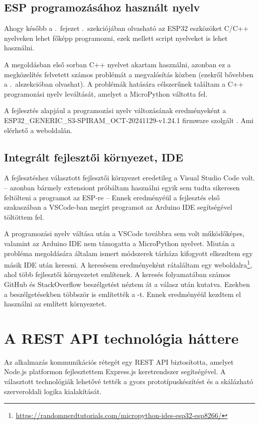 \documentclass{thesis-ekf}
\theoremstyle{definition}
\theoremstyle{remark}
\begin{document}
	\subsection{ESP programozásához használt nyelv}
	Ahogy később a .~fejezet .~szekciójában olvasható az ESP32 eszközöket C/C++ nyelveken lehet főképp programozni, ezek mellett script nyelveket is lehet használni.
	
	A megoldásban első sorban C++ nyelvet akartam használni, azonban ez a megközelítés felvetett számos problémát a megvalósítás közben (ezekről bővebben a .~alszekcióban olvashat). A problémák hatására célszerűnek találtam a C++ programozási nyelv leváltását, amelyet a MicroPython váltotta fel.
	
	A fejlesztés alapjául a programozási nyelv változásának eredményeként a  \\ESP32\_GENERIC\_S3-SPIRAM\_OCT-20241129-v1.24.1 firmware szolgált . Ami elérhető a \href{https://micropython.org/download/}{\color{blue}{MicroPython}} weboldalán.
	\subsection{Integrált fejlesztői környezet, IDE}
	\label{ssec_ide_esp}
	A fejlesztéshez választott fejlesztői környezet eredetileg a Visual Studio Code volt. -- azonban bármely extensiont próbáltam használni egyik sem tudta sikeresen feltölteni a programot az ESP-re -- Ennek eredményéül a fejlesztés első szakaszában a VSCode-ban megírt programot az Arduino IDE segítségével töltöttem fel.
	
	A programozási nyelv váltása után a VSCode továbbra sem volt működőképes, valamint az Arduino IDE nem támogatta a MicroPython nyelvet. Miután a probléma megoldására általam ismert módszerek tárháza kifogyott elkezdtem egy másik IDE után keresni. A keresésem eredményeként rátaláltam egy weboldalra\footnote{\url{https://randomnerdtutorials.com/micropython-ides-esp32-esp8266/}}, ahol több fejlesztői környezetet említenek. A keresés folyamatában számos GitHub és StackOverflow beszélgetést néztem át a válasz után kutatva. Ezekben a beszélgetésekben többször is említették a \href{https://thonny.org/}{\color{blue}{ThonyIDE}}-t. Ennek eredményéül kezdtem el használni az említett környezetet.
	\section{A REST API technológia háttere}
	Az alkalmazás kommunikációs rétegét egy REST API biztosította, amelyet Node.js platformon fejlesztettem Express.js keretrendszer segítségével. A választott technológiák lehetővé tették a gyors prototípuskészítést és a skálázható szerveroldali logika kialakítását.
\end{document}

